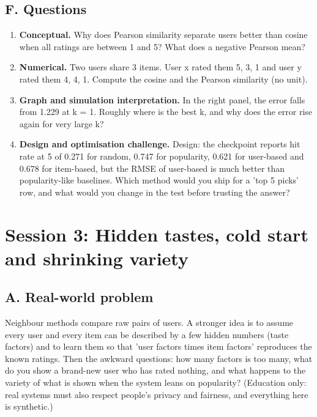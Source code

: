 \documentclass[11pt,a4paper]{article}
\begin{document}
\subsection*{F. Questions}
\begin{enumerate}[nosep]
\item \textbf{Conceptual.} Why does Pearson similarity separate users better than cosine when all ratings are between 1 and 5? What does a negative Pearson mean?
\item \textbf{Numerical.} Two users share 3 items. User x rated them 5, 3, 1 and user y rated them 4, 4, 1. Compute the cosine and the Pearson similarity (no unit).
\item \textbf{Graph and simulation interpretation.} In the right panel, the error falls from 1.229 at k = 1. Roughly where is the best k, and why does the error rise again for very large k?
\item \textbf{Design and optimisation challenge.} Design: the checkpoint reports hit rate at 5 of 0.271 for random, 0.747 for popularity, 0.621 for user-based and 0.678 for item-based, but the RMSE of user-based is much better than popularity-like baselines. Which method would you ship for a 'top 5 picks' row, and what would you change in the test before trusting the answer?
\end{enumerate}

\section{Session 3: Hidden tastes, cold start and shrinking variety}

\subsection*{A. Real-world problem}
Neighbour methods compare raw pairs of users. A stronger idea is to assume every user and every item can be described by a few hidden numbers (taste factors) and to learn them so that 'user factors times item factors' reproduces the known ratings. Then the awkward questions: how many factors is too many, what do you show a brand-new user who has rated nothing, and what happens to the variety of what is shown when the system leans on popularity? (Education only: real systems must also respect people's privacy and fairness, and everything here is synthetic.)
\end{document}

